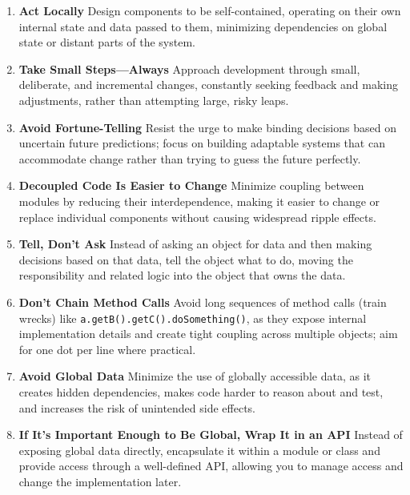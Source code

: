 \documentclass[11pt]{article}
\begin{document}
\begin{tcolorbox}[pragchapterbox={Chapter 5: Bend, or Break}]
\begin{multicols}{2}
\begin{enumerate}[label=\arabic*., start=41, itemsep=1ex, topsep=0pt, partopsep=0pt, labelwidth=!, labelindent=0pt, leftmargin=*]
    \item \textbf{Act Locally}
    Design components to be self-contained, operating on their own internal state and data passed to them, minimizing dependencies on global state or distant parts of the system.

    \item \textbf{Take Small Steps—Always}
    Approach development through small, deliberate, and incremental changes, constantly seeking feedback and making adjustments, rather than attempting large, risky leaps.

    \item \textbf{Avoid Fortune-Telling}
    Resist the urge to make binding decisions based on uncertain future predictions; focus on building adaptable systems that can accommodate change rather than trying to guess the future perfectly.

    \item \textbf{Decoupled Code Is Easier to Change}
    Minimize coupling between modules by reducing their interdependence, making it easier to change or replace individual components without causing widespread ripple effects.

    \item \textbf{Tell, Don’t Ask}
    Instead of asking an object for data and then making decisions based on that data, tell the object what to do, moving the responsibility and related logic into the object that owns the data.

    \item \textbf{Don’t Chain Method Calls}
    Avoid long sequences of method calls (train wrecks) like \texttt{a.getB().getC().doSomething()}, as they expose internal implementation details and create tight coupling across multiple objects; aim for one dot per line where practical.

    \item \textbf{Avoid Global Data}
    Minimize the use of globally accessible data, as it creates hidden dependencies, makes code harder to reason about and test, and increases the risk of unintended side effects.

    \item \textbf{If It’s Important Enough to Be Global, Wrap It in an API}
    Instead of exposing global data directly, encapsulate it within a module or class and provide access through a well-defined API, allowing you to manage access and change the implementation later.


\end{enumerate}
\end{multicols}
\end{tcolorbox}
\end{document}
